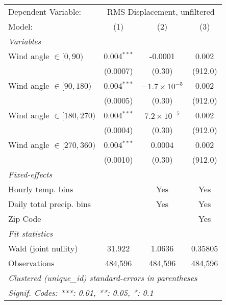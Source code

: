 
\begingroup
\centering
\begin{tabular}{lccc}
   \tabularnewline \midrule \midrule
   Dependent Variable: & \multicolumn{3}{c}{RMS Displacement, unfiltered}\\
   Model:                       & (1)           & (2)                   & (3)\\  
   \midrule
   \emph{Variables}\\
   Wind angle $\in [0, 90)$     & 0.004$^{***}$ & -0.0001               & 0.002\\   
                                & (0.0007)      & (0.30)                & (912.0)\\   
   Wind angle $\in [90, 180)$   & 0.004$^{***}$ & $-1.7\times 10^{-5}$  & 0.002\\   
                                & (0.0005)      & (0.30)                & (912.0)\\   
   Wind angle $\in [180, 270)$  & 0.004$^{***}$ & $7.2\times 10^{-5}$   & 0.002\\   
                                & (0.0004)      & (0.30)                & (912.0)\\   
   Wind angle $\in [270, 360)$  & 0.004$^{***}$ & 0.0004                & 0.002\\   
                                & (0.0010)      & (0.30)                & (912.0)\\   
   \midrule
   \emph{Fixed-effects}\\
   Hourly temp. bins            &               & Yes                   & Yes\\  
   Daily total precip. bins     &               & Yes                   & Yes\\  
   Zip Code                     &               &                       & Yes\\  
   \midrule
   \emph{Fit statistics}\\
   Wald (joint nullity)         & 31.922        & 1.0636                & 0.35805\\  
   Observations                 & 484,596       & 484,596               & 484,596\\  
   \midrule \midrule
   \multicolumn{4}{l}{\emph{Clustered (unique\_id) standard-errors in parentheses}}\\
   \multicolumn{4}{l}{\emph{Signif. Codes: ***: 0.01, **: 0.05, *: 0.1}}\\
\end{tabular}
\par\endgroup


